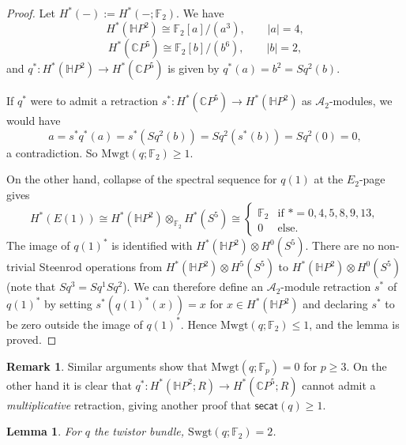 \documentclass{amsart}
\theoremstyle{plain}
\newtheorem{lem}[thm]   {Lemma}
\theoremstyle{definition}
\newtheorem{rem}[thm]{Remark}
\def\secat{\mathsf{secat}}
\newcommand{\C}{\mathbb{C}}
\newcommand{\Ha}{\mathbb{H}}
\newcommand{\F}{\mathbb{F}}
\def\Mwgt{\mathrm{Mwgt}}
\def\Swgt{\mathrm{Swgt}}
\begin{document}
\begin{proof}
Let $H^*(-):=H^*(-;\F_2)$. We have
  \[
 H^*(\Ha P^2)\cong \F_2[a]/(a^3),\qquad |a|=4,
 \]
 \[
 H^*(\C P^5) \cong \F_2[b]/(b^6),\qquad |b|=2,
 \]
 and $q^*:H^*(\Ha P^2)\to H^*(\C P^5)$ is given by $q^*(a)=b^2=Sq^2(b)$.
 
 If $q^*$ were to admit a retraction $s^*:H^*(\C P^5)\to H^*(\Ha P^2)$ as $\mathcal{A}_2$-modules, we would have
 \[
 a=s^* q^*(a)=s^*(Sq^2(b))=Sq^2(s^*(b))=Sq^2(0)=0,
 \]
 a contradiction. So $\Mwgt(q;\F_2)\ge 1$. 
 
 On the other hand, collapse of the spectral sequence for $q(1)$ at the $E_2$-page gives
 \begin{equation}\label{eq:cohE1}
 H^*(E(1)) \cong H^*(\Ha P^2)\otimes_{\F_2} H^*(S^5) \cong \begin{cases} \F_2 & \mbox{if }*=0,4,5,8,9,13, \\ 0 & \mbox{else.} \end{cases}
 \end{equation}
The image of $q(1)^*$ is identified with $H^*(\Ha P^2)\otimes H^0(S^5)$. There are no non-trivial Steenrod operations from $H^*(\Ha P^2)\otimes H^5(S^5)$ to $H^*(\Ha P^2)\otimes H^0(S^5)$ (note that $Sq^3=Sq^1Sq^2$). We can therefore define an $\mathcal{A}_2$-module retraction $s^*$ of $q(1)^*$ by setting $s^*(q(1)^*(x))=x$ for $x\in H^*(\Ha P^2)$ and declaring $s^*$ to be zero outside the image of $q(1)^*$.  Hence $\Mwgt(q;\F_2)\le1$, and the lemma is proved.
 \end{proof}
 
 \begin{rem}
 Similar arguments show that $\Mwgt(q;\F_p)=0$ for $p\ge 3$. On the other hand it is clear that $q^*: H^*(\Ha P^2;R)\to H^*(\C P^5;R)$ cannot admit a \emph{multiplicative} retraction, giving another proof that $\secat(q)\ge1$.
 \end{rem}
 
 \begin{lem}\label{lem:Swgttwistor}
 For $q$ the twistor bundle, $\Swgt(q;\F_2)=2$.
 \end{lem}
 
\end{document}
